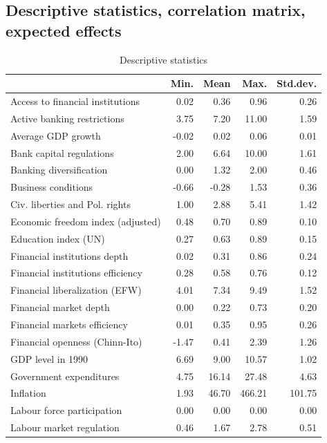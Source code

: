 \begin{refsection}
\begin{subappendices}
    \section{Descriptive statistics, correlation matrix, expected effects}
    \begin{table}[!ht]
    \caption{Descriptive statistics}\label{ch3tab:desc_stat}
    \centering
    \begin{tabular}{lrrrr}
      \toprule
         & Min. & Mean & Max. & Std.dev. \\ 
      \midrule
      Access to financial institutions & 0.02 & 0.36 & 0.96 & 0.26 \\ 
      Active banking restrictions & 3.75 & 7.20 & 11.00 & 1.59 \\ 
      Average GDP growth & -0.02 & 0.02 & 0.06 & 0.01 \\ 
      Bank capital regulations & 2.00 & 6.64 & 10.00 & 1.61 \\ 
      Banking diversification & 0.00 & 1.32 & 2.00 & 0.46 \\ 
      Business conditions & -0.66 & -0.28 & 1.53 & 0.36 \\ 
      Civ. liberties and Pol. rights & 1.00 & 2.88 & 5.41 & 1.42 \\ 
      Economic freedom index (adjusted) & 0.48 & 0.70 & 0.89 & 0.10 \\ 
      Education index (UN) & 0.27 & 0.63 & 0.89 & 0.15 \\ 
      Financial institutions depth & 0.02 & 0.31 & 0.86 & 0.24 \\ 
      Financial institutions efficiency & 0.28 & 0.58 & 0.76 & 0.12 \\ 
      Financial liberalization (EFW) & 4.01 & 7.34 & 9.49 & 1.52 \\ 
      Financial market depth & 0.00 & 0.22 & 0.73 & 0.20 \\ 
      Financial markets efficiency & 0.01 & 0.35 & 0.95 & 0.26 \\ 
      Financial openness (Chinn-Ito) & -1.47 & 0.41 & 2.39 & 1.26 \\ 
      GDP level in 1990 & 6.69 & 9.00 & 10.57 & 1.02 \\ 
      Government expenditures & 4.75 & 16.14 & 27.48 & 4.63 \\ 
      Inflation & 1.93 & 46.70 & 466.21 & 101.75 \\ 
      Labour force participation & 0.00 & 0.00 & 0.00 & 0.00 \\ 
      Labour market regulation & 0.46 & 1.67 & 2.78 & 0.51 \\ 

\end{tabular}
\end{table}
\end{subappendices}
\end{refsection}

